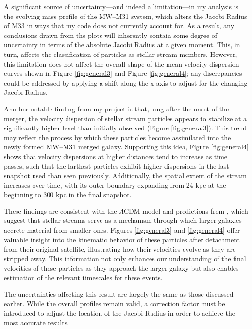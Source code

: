 \documentclass[linenumbers,trackchanges]{aastex7}
\begin{document}
A significant source of uncertainty—and indeed a limitation—in my analysis is the evolving mass profile of the MW–M31 system, which alters the Jacobi Radius of M33 in ways that my code does not currently account for. As a result, any conclusions drawn from the plots will inherently contain some degree of uncertainty in terms of the absolute Jacobi Radius at a given moment. This, in turn, affects the classification of particles as stellar stream members. However, this limitation does not affect the overall shape of the mean velocity dispersion curves shown in Figure \ref{fig:general3} and Figure \ref{fig:general4}; any discrepancies could be addressed by applying a shift along the x-axis to adjust for the changing Jacobi Radius.

Another notable finding from my project is that, long after the onset of the merger, the velocity dispersion of stellar stream particles appears to stabilize at a significantly higher level than initially observed (Figure \ref{fig:general3}). This trend may reflect the process by which these particles become assimilated into the newly formed MW–M31 merged galaxy. Supporting this idea, Figure \ref{fig:general4} shows that velocity dispersions at higher distances tend to increase as time passes, such that the farthest particles exhibit higher dispersions in the last snapshot used than seen previously. Additionally, the spatial extent of the stream increases over time, with its outer boundary expanding from 24 kpc at the beginning to 300 kpc in the final snapshot.

These findings are consistent with the $\Lambda$CDM model and predictions from \cite{Jensen2021-mw}, which suggest that stellar streams serve as a mechanism through which larger galaxies accrete material from smaller ones. Figures \ref{fig:general3} and \ref{fig:general4} offer valuable insight into the kinematic behavior of these particles after detachment from their original satellite, illustrating how their velocities evolve as they are stripped away. This information not only enhances our understanding of the final velocities of these particles as they approach the larger galaxy but also enables estimation of the relevant timescales for these events.

The uncertainties affecting this result are largely the same as those discussed earlier. While the overall profiles remain valid, a correction factor must be introduced to adjust the location of the Jacobi Radius in order to achieve the most accurate results.
\newpage
{}



\end{document}
